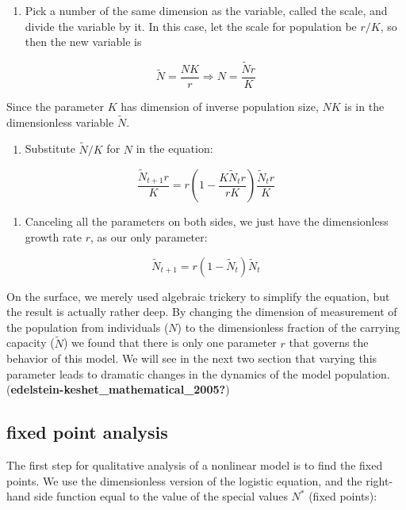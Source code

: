\documentclass[
  letterpaper,
  DIV=11,
  numbers=noendperiod]{scrreprt}
\providecommand{\tightlist}{%
  \setlength{\itemsep}{0pt}\setlength{\parskip}{0pt}}\usepackage{longtable,booktabs,array}
\begin{document}
\begin{enumerate}
\def\labelenumi{\arabic{enumi}.}
\tightlist
\item
  Pick a number of the same dimension as the variable, called the scale,
  and divide the variable by it. In this case, let the scale for
  population be \(r/K\), so then the new variable is
\end{enumerate}

\[
\tilde N = \frac{NK}{r}  \Longrightarrow N = \frac{\tilde N r}{ K }
\]

Since the parameter \(K\) has dimension of inverse population size,
\(NK\) is in the dimensionless variable \(\tilde N\).

\begin{enumerate}
\def\labelenumi{\arabic{enumi}.}
\setcounter{enumi}{1}
\tightlist
\item
  Substitute \(\tilde N / K\) for \(N\) in the equation:
\end{enumerate}

\[
\frac{\tilde N_{t+1}r }{ K} = r\left(1  -\frac{ K \tilde N_t  r}{rK} \right) \frac{\tilde N_t r} {K}
\]

\begin{enumerate}
\def\labelenumi{\arabic{enumi}.}
\setcounter{enumi}{2}
\tightlist
\item
  Canceling all the parameters on both sides, we just have the
  dimensionless growth rate \(r\), as our only parameter:
\end{enumerate}

\[
\tilde N_{t+1}  = r(1 -\tilde N_t)\tilde N_t
\]

On the surface, we merely used algebraic trickery to simplify the
equation, but the result is actually rather deep. By changing the
dimension of measurement of the population from individuals (\(N\)) to
the dimensionless fraction of the carrying capacity (\(\tilde N\)) we
found that there is only one parameter \(r\) that governs the behavior
of this model. We will see in the next two section that varying this
parameter leads to dramatic changes in the dynamics of the model
population. (\textbf{edelstein-keshet\_mathematical\_2005?})

\hypertarget{fixed-point-analysis}{%
\subsection{fixed point analysis}\label{fixed-point-analysis}}

The first step for qualitative analysis of a nonlinear model is to find
the fixed points. We use the dimensionless version of the logistic
equation, and the right-hand side function equal to the value of the
special values \(N^*\) (fixed points):
\end{document}
